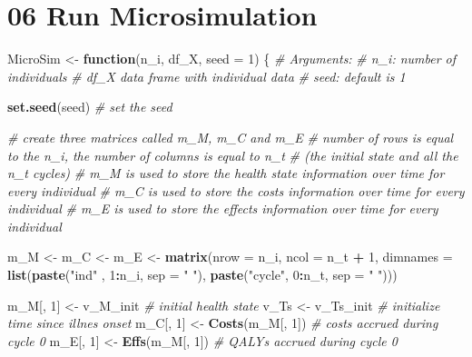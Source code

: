 \documentclass[
]{article}
\newenvironment{Shaded}{\begin{snugshade}}{\end{snugshade}}
\newcommand{\CommentTok}[1]{\textcolor[rgb]{0.56,0.35,0.01}{\textit{#1}}}
\newcommand{\ControlFlowTok}[1]{\textcolor[rgb]{0.13,0.29,0.53}{\textbf{#1}}}
\newcommand{\DataTypeTok}[1]{\textcolor[rgb]{0.13,0.29,0.53}{#1}}
\newcommand{\DecValTok}[1]{\textcolor[rgb]{0.00,0.00,0.81}{#1}}
\newcommand{\KeywordTok}[1]{\textcolor[rgb]{0.13,0.29,0.53}{\textbf{#1}}}
\newcommand{\NormalTok}[1]{#1}
\newcommand{\OperatorTok}[1]{\textcolor[rgb]{0.81,0.36,0.00}{\textbf{#1}}}
\newcommand{\StringTok}[1]{\textcolor[rgb]{0.31,0.60,0.02}{#1}}
\begin{document}
\hypertarget{run-microsimulation}{%
\section{06 Run Microsimulation}\label{run-microsimulation}}

\begin{Shaded}
\begin{Highlighting}[]
\NormalTok{MicroSim <-}\StringTok{ }\ControlFlowTok{function}\NormalTok{(n_i, df_X, }\DataTypeTok{seed =} \DecValTok{1}\NormalTok{) \{}
  \CommentTok{# Arguments:  }
    \CommentTok{# n_i:     number of individuals}
    \CommentTok{# df_X     data frame with individual data }
  \CommentTok{# seed: default is 1}
  
  \KeywordTok{set.seed}\NormalTok{(seed) }\CommentTok{# set the seed}
  
  \CommentTok{# create three matrices called m_M, m_C and m_E}
  \CommentTok{# number of rows is equal to the n_i, the number of columns is equal to n_t }
  \CommentTok{# (the initial state and all the n_t cycles)}
  \CommentTok{# m_M is used to store the health state information over time for every individual}
  \CommentTok{# m_C is used to store the costs information over time for every individual}
  \CommentTok{# m_E is used to store the effects information over time for every individual}
  
\NormalTok{  m_M <-}\StringTok{ }\NormalTok{m_C <-}\StringTok{ }\NormalTok{m_E <-}\StringTok{  }\KeywordTok{matrix}\NormalTok{(}\DataTypeTok{nrow =}\NormalTok{ n_i, }\DataTypeTok{ncol =}\NormalTok{ n_t }\OperatorTok{+}\StringTok{ }\DecValTok{1}\NormalTok{, }
                                       \DataTypeTok{dimnames =} \KeywordTok{list}\NormalTok{(}\KeywordTok{paste}\NormalTok{(}\StringTok{"ind"}\NormalTok{  , }\DecValTok{1}\OperatorTok{:}\NormalTok{n_i, }\DataTypeTok{sep =} \StringTok{" "}\NormalTok{), }
                                                       \KeywordTok{paste}\NormalTok{(}\StringTok{"cycle"}\NormalTok{, }\DecValTok{0}\OperatorTok{:}\NormalTok{n_t, }\DataTypeTok{sep =} \StringTok{" "}\NormalTok{)))  }
 
\NormalTok{  m_M[, }\DecValTok{1}\NormalTok{] <-}\StringTok{ }\NormalTok{v_M_init          }\CommentTok{# initial health state}
\NormalTok{  v_Ts     <-}\StringTok{ }\NormalTok{v_Ts_init         }\CommentTok{# initialize time since illnes onset}
\NormalTok{  m_C[, }\DecValTok{1}\NormalTok{] <-}\StringTok{ }\KeywordTok{Costs}\NormalTok{(m_M[, }\DecValTok{1}\NormalTok{])   }\CommentTok{# costs accrued  during cycle 0}
\NormalTok{  m_E[, }\DecValTok{1}\NormalTok{] <-}\StringTok{ }\KeywordTok{Effs}\NormalTok{(m_M[, }\DecValTok{1}\NormalTok{])    }\CommentTok{# QALYs accrued  during cycle 0}
  

\end{Highlighting}
\end{Shaded}
\end{document}
